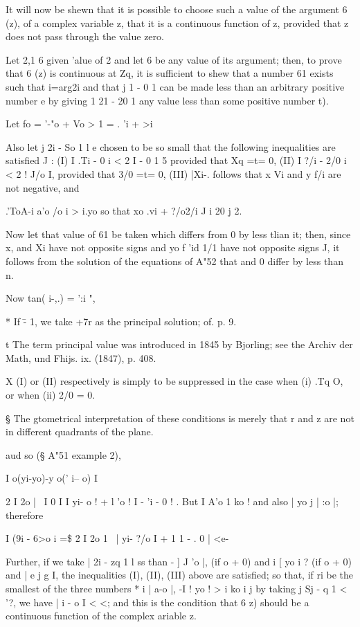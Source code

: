 It will now be shewn that it is possible to choose such a value of the
argument 6 (z), of a complex variable z, that it is a continuous
function of z, provided that z does not pass through the value zero.

Let 2,1 6 given 'alue of 2 and let 6 be any value of its argument;
then, to prove that 6 (z) is continuous at Zq, it is sufficient to
shew that a number 61 exists such that i=arg2i and that j 1 - 0 1 can
be made less than an arbitrary positive number e by giving 1 21 - 20 1
any value less than some positive number t).

Let fo = '-"o + Vo > 1 = . 'i + >i

Also let j 2i - So 1 l e chosen to be so small that the following
inequalities are satisfied J : (I) I .Ti - 0 i < 2 I - 0 1 5 provided
that Xq =t= 0, (II) I ?/i - 2/0 i < 2 ! J/o I, provided that 3/0 =t=
0, (III) |Xi-.%
follows that x Vi and y f/i are not negative, and

.'ToA-i a'o /o i > i.yo so that xo .vi + ?/o2/i J i 20 j 2.

Now let that value of 61 be taken which differs from 0 by less tlian
it; then, since x, and Xi have not opposite signs and yo f 'id 1/1
have not opposite signs J, it follows from the solution of the
equations of A"52 that and 0 differ by less than n.

Now tan( i-,.) = ':i ",

* If \= - 1, we take +7r as the principal solution; of. p. 9.

t The term principal value was introduced in 1845 by Bjorling; see
the Archiv der Math, und Fhijs. ix. (1847), p. 408.

X (I) or (II) respectively is simply to be suppressed in the case when
(i) .Tq O, or when (ii) 2/0 = 0.

§ The gtometrical interpretation of these conditions is merely that r
and z are not in different quadrants of the plane.

%
%
aud so (§ A"51
example 2),

  I o(yi-yo)-y o(' i-- o) I

  2 I 2o |~ I 0 I  I yi- o ! + l 'o !  I - 'i - 0 ! . But I A'o 1 ko
! and also | yo j | :o |; therefore

I (9i - 6>o i =\$ 2 I 2o 1~ | yi- ?/o I + 1 1 - . 0 | <e-

Further, if we take | 2i - zq 1 l ss than  - ] J 'o |, (if o + 0)
and i [ yo i ? (if o + 0) and | e j g I, the inequalities (I), (II),
(III) above are satisfied; so that, if ri be the smallest of the
three numbers * i | a-o |, -I ! yo ! > i ko i j by taking j Sj - q 1
< '?, we have | i - o I < <; and this is the condition that 6 z)
should be a continuous function of the complex ariable z.

